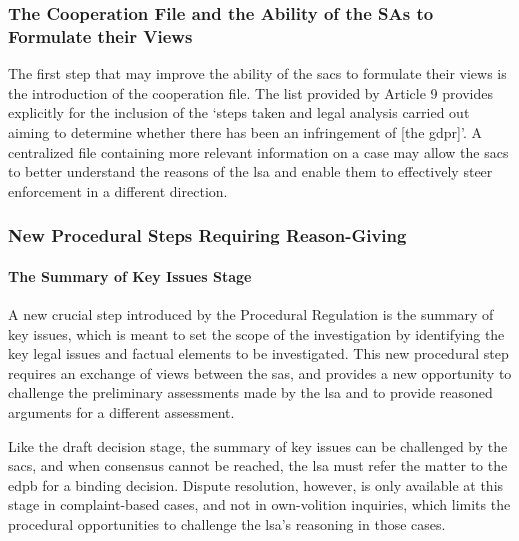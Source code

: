 \subsubsection{The Cooperation File and the Ability of the SAs to Formulate their Views}
\label{sec:ch5-cooperation-file}

The first step that may improve the ability of the \glspl{sac} to formulate their views is the introduction of the cooperation file.
The list provided by Article 9 provides explicitly for the inclusion of the `steps taken and legal analysis carried out aiming to determine whether there has been an infringement of [the \gls{gdpr}]'.\autocite[9(1)(i)]{ProceduralRegulation}
A centralized file containing more relevant information on a case may allow the \glspl{sac} to better understand the reasons of the \gls{lsa} and enable them to effectively steer enforcement in a different direction.

\subsubsection{New Procedural Steps Requiring Reason-Giving}
\label{sec:ch5-new-procedural-steps}

\paragraph{The Summary of Key Issues Stage}

A new crucial step introduced by the Procedural Regulation is the summary of key issues, which is meant to set the scope of the investigation by identifying the key legal issues and factual elements to be investigated.\autocite[10]{ProceduralRegulation}
This new procedural step requires an exchange of views between the \glspl{sa}, and provides a new opportunity to challenge the preliminary assessments made by the \gls{lsa} and to provide reasoned arguments for a different assessment.\autocite[10--11]{ProceduralRegulation}

Like the draft decision stage, the summary of key issues can be challenged by the \glspl{sac}, and when consensus cannot be reached, the \gls{lsa} must refer the matter to the \gls{edpb} for a binding decision.\autocite[11(6)]{ProceduralRegulation}
Dispute resolution, however, is only available at this stage in complaint-based cases, and not in own-volition inquiries, which limits the procedural opportunities to challenge the \gls{lsa}'s reasoning in those cases.\autocites[505]{mustertProceduralisingEnforcement2026}[11(6)]{ProceduralRegulation}

